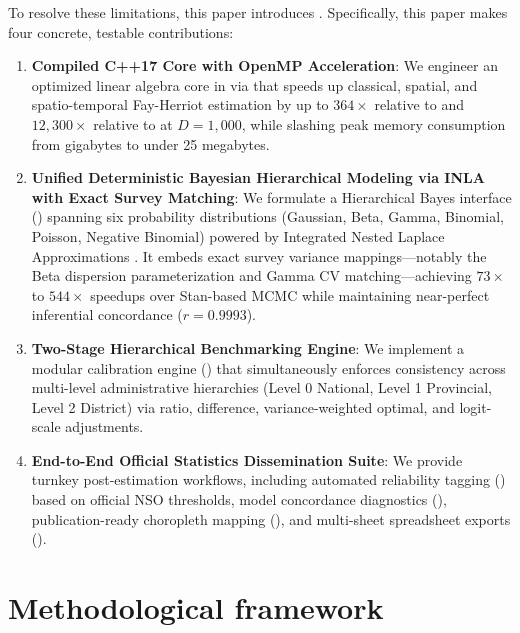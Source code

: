 \documentclass[article]{jss}
\begin{document}
To resolve these limitations, this paper introduces . Specifically, this paper makes four concrete, testable contributions:
%
\begin{enumerate}
  \item \textbf{Compiled C++17 Core with OpenMP Acceleration}: We engineer an optimized linear algebra core in  via  that speeds up classical, spatial, and spatio-temporal Fay-Herriot estimation by up to $364\times$ relative to  and $12,300\times$ relative to  at $D=1,000$, while slashing peak memory consumption from gigabytes to under 25 megabytes.
  \item \textbf{Unified Deterministic Bayesian Hierarchical Modeling via INLA with Exact Survey Matching}: We formulate a Hierarchical Bayes interface () spanning six probability distributions (Gaussian, Beta, Gamma, Binomial, Poisson, Negative Binomial) powered by Integrated Nested Laplace Approximations \citep{rue2009approximate}. It embeds exact survey variance mappings---notably the \citet{janicki2020properties} Beta dispersion parameterization and Gamma CV matching---achieving $73\times$ to $544\times$ speedups over Stan-based MCMC while maintaining near-perfect inferential concordance ($r = 0.9993$).
  \item \textbf{Two-Stage Hierarchical Benchmarking Engine}: We implement a modular calibration engine () that simultaneously enforces consistency across multi-level administrative hierarchies (Level 0 National, Level 1 Provincial, Level 2 District) via ratio, difference, variance-weighted optimal, and logit-scale adjustments.
  \item \textbf{End-to-End Official Statistics Dissemination Suite}: We provide turnkey post-estimation workflows, including automated reliability tagging () based on official NSO thresholds, model concordance diagnostics (), publication-ready choropleth mapping (), and multi-sheet spreadsheet exports ().
\end{enumerate}


\section{Methodological framework} \label{sec:methods}
\end{document}
